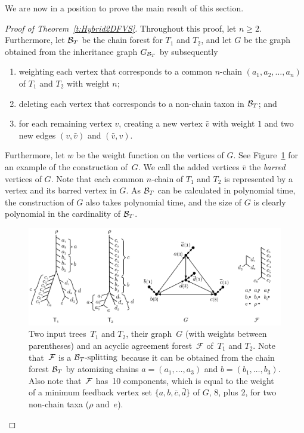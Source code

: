 We are now in a position to prove the main result of this section.
\begin{proof}[Proof of Theorem~\ref{t:Hybrid2DFVS}]
Throughout this proof, let $n\geq 2$. Furthermore, let ${\mathcal B}_T$ be the chain forest for $T_1$ and $T_2$, and let $G$ be the graph obtained from the inheritance graph $G_{{\mathcal B}_T}$ by subsequently
\begin{enumerate}
\item weighting each vertex that corresponds to a common $n$-chain $(a_1,a_2,\ldots,a_n)$ of $T_1$ and $T_2$  with weight $n$;
\item deleting each vertex that  corresponds to a non-chain taxon in ${\mathcal B}_T$; and
\item for each remaining vertex $v$, creating a new vertex $\bar{v}$ with weight $1$ and two new edges $(v,\bar{v})$ and $(\bar{v},v)$.
\end{enumerate}
Furthermore, let $w$ be the weight function on the vertices of $G$. See Figure~\ref{fig:todfvs1} for an example of the construction of~$G$. We call the added vertices $\bar{v}$ the \emph{barred} vertices of $G$. Note that each common $n$-chain of $T_1$ and $T_2$ is represented by a vertex and its barred vertex in $G$. As ${\mathcal B}_T$ can be calculated in polynomial time, the construction of $G$ also takes polynomial time, {and the size of $G$ is clearly polynomial in the cardinality of ${\mathcal B}_T$}.

\begin{figure}
    \centering
     \includegraphics[scale=.4]{../figs/fig_todfvs1v5}
    \caption{Two input trees~$T_1$ and $T_2$, their graph~$G$ (with weights between parentheses) and an acyclic agreement forest~$\mathcal{F}$ of~$T_1$ and $T_2$. Note that~${\mathcal F}$ is a ${{\mathcal B}_T\text{-splitting}}$ because it can be obtained from the chain forest ${\mathcal B}_T$  by atomizing chains $a=(a_1,\ldots,a_3)$ and $b=(b_1,\ldots,b_3)$. Also note that~${\mathcal F}$ has~10 components, which is equal to the weight of a minimum feedback vertex set $\{a,b,\bar{c},\bar{d}\}$ of $G$, 8, plus 2, for two non-chain taxa ($\rho$ and~$e$).
}
 \label{fig:todfvs1}
\end{figure}


\end{proof}
